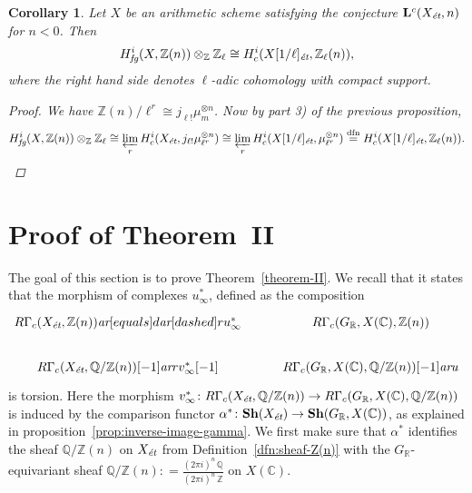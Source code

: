 \documentclass[leqno,12pt]{article}
\theoremstyle{plain}
\newtheorem{corollary}[theorem]{\indent\sc Corollary}
\theoremstyle{definition}
\newcommand{\ZZ}{\mathbb{Z}}
\newcommand{\QQ}{\mathbb{Q}}
\newcommand{\RR}{\mathbb{R}}
\newcommand{\CC}{\mathbb{C}}
\newcommand{\dfn}{\mathrel{\mathop:}=}
\newcommand{\et}{\text{\it \'{e}t}}
\newcommand{\fg}{\text{\it fg}}
\newcommand{\ar}{\text{\it ar}}
\begin{document}
\begin{corollary}
  \label{cor:RGamma-fg-model-for-l-adic-cohomology}
  Let $X$ be an arithmetic scheme satisfying the conjecture
  $\mathbf{L}^c (X_\et, n)$ for $n < 0$. Then
  $$H_\fg^i (X, \ZZ (n)) \otimes_\ZZ \ZZ_\ell \cong H^i_c (X [1/\ell]_\et, \ZZ_\ell (n)),$$
  where the right hand side denotes $\ell$-adic cohomology with compact support.

  \begin{proof}
    We have $\ZZ (n)/\ell^r \cong j_{\ell!} \mu_m^{\otimes n}$.
    Now by part 3) of the previous proposition,
    \[ H_\fg^i (X, \ZZ (n)) \otimes_\ZZ \ZZ_\ell \cong
      \varprojlim_r H_c^i (X_\et, j_{\ell!} \mu_{\ell^r}^{\otimes n}) \cong
      \varprojlim_r H_c^i (X [1/\ell]_\et, \mu_{\ell^r}^{\otimes n})
      \stackrel{\text{dfn}}{=} H_c^i (X [1/\ell]_\et, \ZZ_\ell (n)). \qedhere \]
  \end{proof}
\end{corollary}


\section{Proof of Theorem~II}
\label{sec:theorem-II}

The goal of this section is to prove Theorem~\ref{theorem-II}. We recall that it
states that the morphism of complexes $u_\infty^*$, defined as the composition
\[ \begin{tikzcd}
  R\Gamma_c (X_\et, \ZZ(n)) \ar[equals]{d}\ar[dashed]{r}{u_\infty^*} & R\Gamma_c (G_\RR, X (\CC), \ZZ (n)) \\
  R\Gamma_c (X_\et, \QQ/\ZZ (n)) [-1] \ar{r}{v_\infty^* [-1]} & R\Gamma_c (G_\RR, X (\CC), \QQ/\ZZ (n)) [-1] \ar{u}
\end{tikzcd} \]
is torsion. Here the morphism
$v_\infty^*\colon R\Gamma_c (X_\et, \QQ/\ZZ (n)) \to R\Gamma_c (G_\RR, X (\CC), \QQ/\ZZ (n))$
is induced by the comparison functor
$\alpha^*\colon \mathbf{Sh} (X_\et) \to \mathbf{Sh} (G_\RR, X (\CC))$, as
explained in proposition~\ref{prop:inverse-image-gamma}. We first make sure that
$\alpha^*$ identifies the sheaf $\QQ/\ZZ (n)$ on $X_\et$ from
Definition~\ref{dfn:sheaf-Z(n)} with the $G_\RR$-equivariant sheaf
$\QQ/\ZZ (n) \dfn \frac{(2\pi i)^n\,\QQ}{(2\pi i)^n\,\ZZ}$ on $X (\CC)$.
\end{document}
